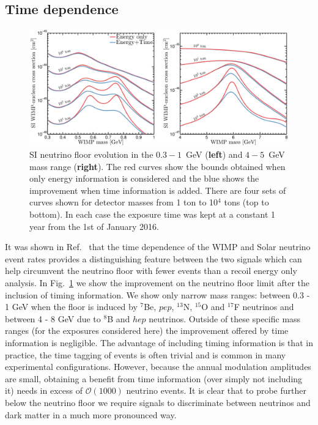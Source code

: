 \subsection{Time dependence}
\begin{figure}
\begin{center}
\includegraphics[trim = 0mm 0mm 0mm 0mm, clip,width=\textwidth,angle=0]{Figures/DL_Time.eps}
\caption[Neutrino floor evolution with timing information]{SI neutrino floor evolution in the $0.3 - 1$~GeV ({\bf left}) and $4 - 5$~GeV mass range ({\bf right}). The red curves show the bounds obtained when only energy information is considered and the blue shows the improvement when time information is added. There are four sets of curves shown for detector masses from 1 ton to 10$^4$ tons (top to bottom). In each case the exposure time was kept at a constant 1 year from the 1st of January 2016.} 
\label{fig:DL_Time}
\end{center}
\end{figure}
It was shown in Ref.~\cite{Davis:2014ama} that the time dependence of the WIMP and Solar neutrino event rates provides a distinguishing feature between the two signals which can help circumvent the neutrino floor with fewer events than a recoil energy only analysis. In Fig.~\ref{fig:DL_Time} we show the improvement on the neutrino floor limit after the inclusion of timing information. We show only narrow mass ranges: between 0.3 - 1 GeV when the floor is induced by $^7$Be, $pep$, $^{13}$N, $^{15}$O and $^{17}$F neutrinos and between 4 - 8 GeV due to $^8$B and $hep$ neutrinos. Outside of these specific mass ranges (for the exposures considered here) the improvement offered by time information is negligible. The advantage of including timing information is that in practice, the time tagging of events is often trivial and is common in many experimental configurations. However, because the annual modulation amplitudes are small, obtaining a benefit from time information (over simply not including it) needs in excess of $\mathcal{O}(1000)$ neutrino events. It is clear that to probe further below the neutrino floor we require signals to discriminate between neutrinos and dark matter in a much more pronounced way.




